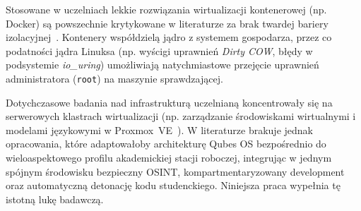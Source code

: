 Stosowane w uczelniach lekkie rozwiązania wirtualizacji kontenerowej (np. Docker) są powszechnie krytykowane w literaturze za brak twardej bariery izolacyjnej~\cite{sultan2019containers}. Kontenery współdzielą jądro z systemem gospodarza, przez co podatności jądra Linuksa (np. wyścigi uprawnień \textit{Dirty COW}, błędy w podsystemie \textit{io\_uring}) umożliwiają natychmiastowe przejęcie uprawnień administratora (\texttt{root}) na maszynie sprawdzającej.

Dotychczasowe badania nad infrastrukturą uczelnianą koncentrowały się na serwerowych klastrach wirtualizacji (np. zarządzanie środowiskami wirtualnymi i modelami językowymi w Proxmox~VE~\cite{zarnecki2026llm_proxmox}). W literaturze brakuje jednak opracowania, które adaptowałoby architekturę Qubes OS bezpośrednio do wieloaspektowego profilu akademickiej stacji roboczej, integrując w jednym spójnym środowisku bezpieczny OSINT, kompartmentaryzowany development oraz automatyczną detonację kodu studenckiego. Niniejsza praca wypełnia tę istotną lukę badawczą.
